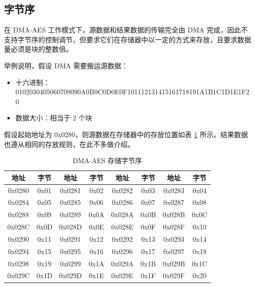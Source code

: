 \documentclass[main\_\_CN.tex]{subfiles}
\begin{document}
\subsection{字节序}

在 DMA-AES 工作模式下，源数据和结果数据的传输完全由 DMA 完成，因此不支持字节序的控制调节，但要求它们在存储器中以一定的方式来存放，且要求数据量必须是块的整数倍。

举例说明，假设 DMA 需要搬运源数据：

\begin{itemize}
    \item 十六进制： 0102030405060708090A0B0C0D0E0F101112131415161718191A1B1C1D1E1F20
    \item 数据大小：相当于 2 个块
\end{itemize}

假设起始地址为 0x0280，则源数据在存储器中的存放位置如表 \ref{tab:aes-dma-aes-plaintext-ciphertext-endian} 所示。结果数据也遵从相同的存放规则，在此不多做介绍。

\begin{longtable}[c]
{ |c|c|c|c|c|c|c|c|}
\caption{DMA-AES 存储字节序}
\label{tab:aes-dma-aes-plaintext-ciphertext-endian}\\
\hline
\rowcolor{lightgray}
\textbf{地址} &  \textbf{字节}  & \textbf{地址} &  \textbf{字节}  & \textbf{地址} &  \textbf{字节}  & \textbf{地址} &  \textbf{字节} \\\hline
0x0280 & 0x01 & 0x0281 & 0x02 & 0x0282 & 0x03 & 0x0283 & 0x04 \\\hline
0x0284 & 0x05 & 0x0285 & 0x06 & 0x0286 & 0x07 & 0x0287 & 0x08 \\\hline
0x0288 & 0x09 & 0x0289 & 0x0A & 0x028A & 0x0B & 0x028B & 0x0C \\\hline
0x028C & 0x0D & 0x028D & 0x0E & 0x028E & 0x0F & 0x028F & 0x10 \\\hline
0x0290 & 0x11 & 0x0291 & 0x12 & 0x0292 & 0x13 & 0x0293 & 0x14 \\\hline
0x0294 & 0x15 & 0x0295 & 0x16 & 0x0296 & 0x17 & 0x0297 & 0x18 \\\hline
0x0298 & 0x19 & 0x0299 & 0x1A & 0x029A & 0x1B & 0x029B & 0x1C \\\hline
0x029C & 0x1D & 0x029D & 0x1E & 0x029E & 0x1F & 0x029F & 0x20 \\\hline
\end{longtable}

\end{document}
